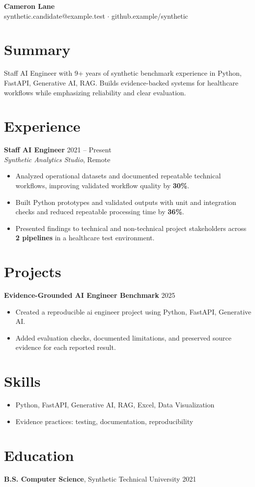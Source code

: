 \documentclass[10pt,letterpaper]{article}
\newcommand{\resumeItem}[1]{\item #1}
\newcommand{\resumeItemListStart}{\begin{itemize}[leftmargin=*]}
\newcommand{\resumeItemListEnd}{\end{itemize}}
\begin{document}
\begin{center}
{\Large \textbf{Cameron Lane}}\\
synthetic.candidate@example.test $\cdot$ github.example/synthetic
\end{center}

\section*{Summary}
Staff AI Engineer with 9+ years of synthetic benchmark experience in Python, FastAPI, Generative AI, RAG. Builds evidence-backed systems for healthcare workflows while emphasizing reliability and clear evaluation.

\section*{Experience}
\textbf{Staff AI Engineer} \hfill 2021 -- Present\\
\textit{Synthetic Analytics Studio}, Remote
\resumeItemListStart
  \resumeItem{Analyzed operational datasets and documented repeatable technical workflows, improving validated workflow quality by \textbf{30\%}.}
  \resumeItem{Built Python prototypes and validated outputs with unit and integration checks and reduced repeatable processing time by \textbf{36\%}.}
  \resumeItem{Presented findings to technical and non-technical project stakeholders across \textbf{2 pipelines} in a healthcare test environment.}
\resumeItemListEnd

\section*{Projects}
\textbf{Evidence-Grounded AI Engineer Benchmark} \hfill 2025
\resumeItemListStart
  \resumeItem{Created a reproducible ai engineer project using Python, FastAPI, Generative AI.}
  \resumeItem{Added evaluation checks, documented limitations, and preserved source evidence for each reported result.}
\resumeItemListEnd

\section*{Skills}
\resumeItemListStart
  \resumeItem{Python, FastAPI, Generative AI, RAG, Excel, Data Visualization}
  \resumeItem{Evidence practices: testing, documentation, reproducibility}
\resumeItemListEnd

\section*{Education}
\textbf{B.S. Computer Science}, Synthetic Technical University \hfill 2021
\end{document}
